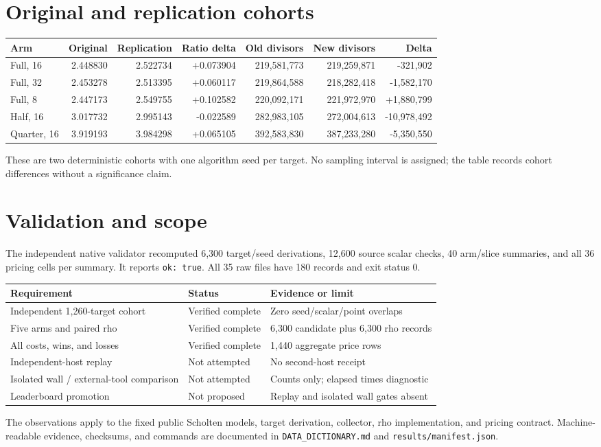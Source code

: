 \documentclass[10pt]{article}
\begin{document}
\section*{Original and replication cohorts}
\small
\begin{tabular}{@{}lrrrrrr@{}}
\toprule
Arm & Original & Replication & Ratio delta & Old divisors & New divisors & Delta \\
\midrule
Full, 16 & 2.448830 & 2.522734 & +0.073904 & 219,581,773 & 219,259,871 & -321,902 \\
Full, 32 & 2.453278 & 2.513395 & +0.060117 & 219,864,588 & 218,282,418 & -1,582,170 \\
Full, 8 & 2.447173 & 2.549755 & +0.102582 & 220,092,171 & 221,972,970 & +1,880,799 \\
Half, 16 & 3.017732 & 2.995143 & -0.022589 & 282,983,105 & 272,004,613 & -10,978,492 \\
Quarter, 16 & 3.919193 & 3.984298 & +0.065105 & 392,583,830 & 387,233,280 & -5,350,550 \\
\bottomrule
\end{tabular}
\normalsize

These are two deterministic cohorts with one algorithm seed per target. No
sampling interval is assigned; the table records cohort differences without a
significance claim.

\section*{Validation and scope}
The independent native validator recomputed 6,300 target/seed derivations,
12,600 source scalar checks, 40 arm/slice summaries, and all 36 pricing cells
per summary. It reports \texttt{ok: true}. All 35 raw files have 180 records and
exit status 0.

\begin{tabular}{@{}p{}p{}p{}@{}}
\toprule
Requirement & Status & Evidence or limit \\
\midrule
Independent 1,260-target cohort & Verified complete & Zero seed/scalar/point overlaps \\
Five arms and paired rho & Verified complete & 6,300 candidate plus 6,300 rho records \\
All costs, wins, and losses & Verified complete & 1,440 aggregate price rows \\
Independent-host replay & Not attempted & No second-host receipt \\
Isolated wall / external-tool comparison & Not attempted & Counts only; elapsed times diagnostic \\
Leaderboard promotion & Not proposed & Replay and isolated wall gates absent \\
\bottomrule
\end{tabular}

The observations apply to the fixed public Scholten models, target derivation,
collector, rho implementation, and pricing contract. Machine-readable evidence,
checksums, and commands are documented in \texttt{DATA\_DICTIONARY.md} and
\texttt{results/manifest.json}.
\end{document}
